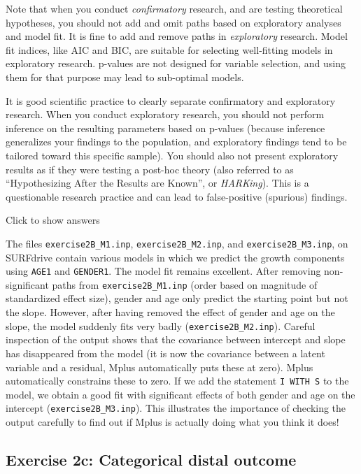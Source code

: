 \documentclass[
]{book}
\begin{document}
Note that when you conduct \emph{confirmatory} research, and are testing theoretical hypotheses, you should not add and omit paths based on exploratory analyses and model fit. It is fine to add and remove paths in \emph{exploratory} research. Model fit indices, like AIC and BIC, are suitable for selecting well-fitting models in exploratory research. p-values are not designed for variable selection, and using them for that purpose may lead to sub-optimal models.

It is good scientific practice to clearly separate confirmatory and exploratory research. When you conduct exploratory research, you should not perform inference on the resulting parameters based on p-values (because inference generalizes your findings to the population, and exploratory findings tend to be tailored toward this specific sample). You should also not present exploratory results as if they were testing a post-hoc theory (also referred to as ``Hypothesizing After the Results are Known'', or \emph{HARKing}). This is a questionable research practice and can lead to false-positive (spurious) findings.

Click to show answers

The files \texttt{exercise2B\_M1.inp}, \texttt{exercise2B\_M2.inp}, and \texttt{exercise2B\_M3.inp}, on SURFdrive contain various models in which we predict the growth components using \texttt{AGE1} and \texttt{GENDER1}. The model fit remains excellent. After removing non-significant paths from \texttt{exercise2B\_M1.inp} (order based on magnitude of standardized effect size), gender and age only predict the starting point but not the slope. However, after having removed the effect of gender and age on the slope, the model suddenly fits very badly (\texttt{exercise2B\_M2.inp}). Careful inspection of the output shows that the covariance between intercept and slope has disappeared from the model (it is now the covariance between a latent variable and a residual, Mplus automatically puts these at zero). Mplus automatically constrains these to zero. If we add the statement \texttt{I\ WITH\ S} to the model, we obtain a good fit with significant effects of both gender and age on the intercept (\texttt{exercise2B\_M3.inp}). This illustrates the importance of checking the output carefully to find out if Mplus is actually doing what you think it does!

\hypertarget{exercise-2c-categorical-distal-outcome}{%
\subsection{Exercise 2c: Categorical distal outcome}\label{exercise-2c-categorical-distal-outcome}}
\end{document}
